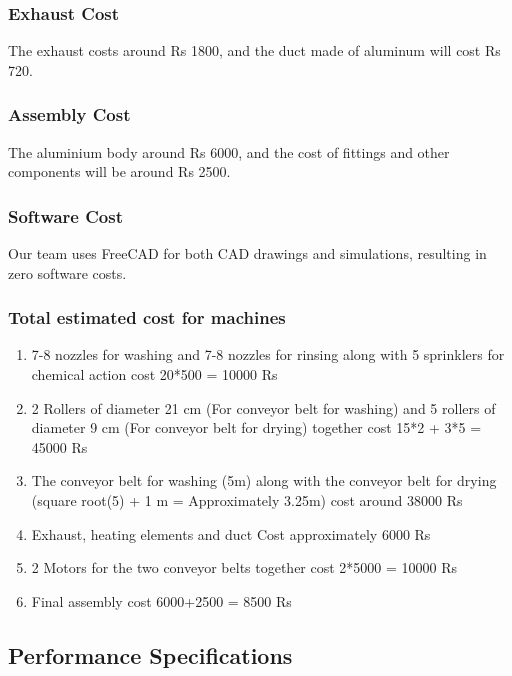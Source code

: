\documentclass[12pt]{article} %
\begin{document}
\subsubsection{Exhaust Cost} 
The exhaust costs around Rs 1800, and the duct made of aluminum will cost Rs 720.

\subsubsection{Assembly Cost} 
The aluminium body around Rs 6000, and the cost of fittings and other components will be around Rs 2500.

\subsubsection{Software Cost} 
Our team uses FreeCAD for both CAD drawings and simulations, resulting in zero software costs.

\subsubsection{Total estimated cost for machines}
\begin{enumerate}
    \item  7-8 nozzles for washing and 7-8 nozzles for rinsing along with 5 sprinklers for chemical action cost 20*500 = 10000 Rs
    \item 2 Rollers of diameter 21 cm (For conveyor belt for washing) and 5 rollers of diameter 9 cm (For conveyor belt for drying) together cost 15*2 + 3*5 = 45000 Rs
    \item The conveyor belt for washing (5m) along with the conveyor belt for drying (square root(5) + 1 m = Approximately 3.25m) cost around 38000 Rs
    \item Exhaust, heating elements and duct Cost approximately 6000 Rs
    \item 2 Motors for the two conveyor belts together cost 2*5000 = 10000 Rs
    \item Final assembly cost 6000+2500 = 8500 Rs
\end{enumerate}


\clearpage
\subsection{Performance Specifications}
\end{document}
